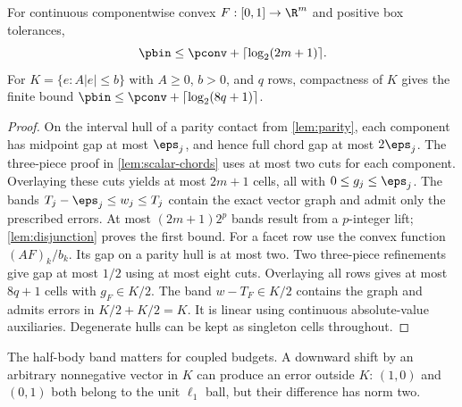 \begin{proposition}\label{prop:finite-vector-overlay}
For continuous componentwise convex $F:[0,1]\to\R^m$ and positive box
tolerances,
\[
 \pbin\le\pconv+\lceil\log_2(2m+1)\rceil.
\]
For $K=\{e:A|e|\le b\}$ with $A\ge0$, $b>0$, and $q$ rows, compactness
of $K$ gives the finite bound
$\pbin\le\pconv+\lceil\log_2(8q+1)\rceil$.
\end{proposition}
\begin{proof}
On the interval hull of a parity contact from \cref{lem:parity},
each component has midpoint gap at most $\eps_j$, and hence full chord
gap at most $2\eps_j$. The three-piece proof in
\cref{lem:scalar-chords} uses at most two cuts for each component.
Overlaying these cuts yields at most $2m+1$ cells, all with
$0\le g_j\le\eps_j$. The bands
$T_j-\eps_j\le w_j\le T_j$ contain the exact vector graph and admit
only the prescribed errors. At most $(2m+1)2^p$ bands result from a
$p$-integer lift; \cref{lem:disjunction} proves the first bound.
For a facet row use the convex function $(AF)_k/b_k$. Its gap on a
parity hull is at most two. Two three-piece refinements give gap at
most $1/2$ using at most eight cuts. Overlaying all rows gives at most
$8q+1$ cells with $g_F\in K/2$. The band $w-T_F\in K/2$ contains
the graph and admits errors in $K/2+K/2=K$. It is linear using
continuous absolute-value auxiliaries. Degenerate hulls can be kept
as singleton cells throughout.
\end{proof}

The half-body band matters for coupled budgets. A downward shift by an
arbitrary nonnegative vector in $K$ can produce an error outside $K$:
$(1,0)$ and $(0,1)$ both belong to the unit $\ell_1$ ball, but their
difference has norm two.

